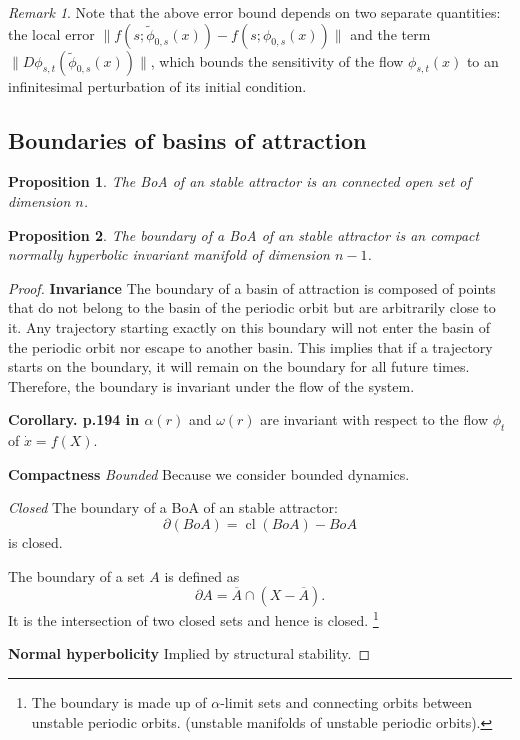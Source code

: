\documentclass{article}
\newtheorem{proposition}{Proposition}
\theoremstyle{definition} \newtheorem{definition}{Definition}
\theoremstyle{remark} \newtheorem{remark}{Remark}
\newcommand{\cl}{\operatorname{cl}}
\newcounter{ct}
\begin{document}
\begin{remark}\label{rem:313}
Note that the above error bound depends on two separate quantities: 
the local error \( \| f(s; \tilde{\phi}_{0,s}(x)) - f(s; \phi_{0,s}(x)) \| \) 
and 
the term \( \| D\phi_{s,t}(\tilde{\phi}_{0,s}(x)) \| \), which bounds the sensitivity of the flow \( \phi_{s,t}(x) \) to an infinitesimal perturbation of its initial condition.
\end{remark}


\subsection{Boundaries of basins of attraction}\label{sec:boaboundary}

\begin{proposition}
The BoA of an stable attractor is an connected open set of dimension $n$. %
\end{proposition}


\begin{proposition}
The boundary of a BoA of an stable attractor is an compact normally hyperbolic invariant manifold of dimension $n-1$. %
\end{proposition}

\begin{proof}
\textbf{Invariance}
The boundary of a basin of attraction is composed of points that do not belong to the basin of the periodic orbit but are arbitrarily close to it.
 Any trajectory starting exactly on this boundary will not enter the basin of the periodic orbit nor escape to another basin.
This implies that if a trajectory starts on the boundary, it will remain on the boundary for all future times. Therefore, the boundary is invariant under the flow of the system.


\textbf{Corollary. p.194 in \citep{perko2013differential}} \( \alpha(r) \) and \( \omega(r) \) are invariant with respect to the flow \( \phi_t \) of \(\dot x = f(X)\). %

\textbf{Compactness}
\textit{Bounded} Because we consider bounded dynamics.

\textit{Closed} 
The boundary of a BoA of an stable attractor:
\[\partial(BoA) = \cl(BoA) -  BoA\]
is closed.

The boundary of a set \( A \) is defined as 
\[
\partial A = \overline{A} \cap (X - \overline{A}).
\]
It is the intersection of two closed sets and hence is closed.
\footnote{
The boundary is made up of 
$\alpha$-limit sets 
and
connecting orbits between unstable periodic orbits.
(unstable manifolds of unstable periodic orbits).
}


\textbf{Normal hyperbolicity}
Implied by structural stability.

\end{proof}
\end{document}

